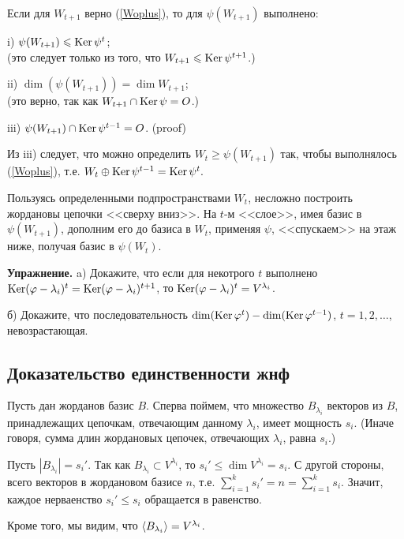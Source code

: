 Если для $W_{t+1}$ верно (\ref{Woplus}), то для $\psi (W_{t+1})$ выполнено:

i)  $\psi (W_{t+1}) \leqslant \mathop{\rm Ker}\nolimits \psi ^t $;\\
(это следует только из того, что $W_{t+1} \leqslant \mathop{\rm Ker}\nolimits \psi ^{t+1}$.)

ii) $\dim (\psi (W_{t+1})) =  \dim W_{t+1}$;\\
(это верно, так как $W_{t+1}\cap \mathop{\rm Ker}\nolimits \psi = O$.)

iii) $\psi (W_{t+1}) \cap \mathop{\rm Ker}\nolimits \psi ^{t-1} = O $.
(proof)

Из iii) следует, что можно определить $W_t\geq \psi (W_{t+1}) $ так, чтобы выполнялось 
(\ref{Woplus}), т.е. $W_{t} \oplus \mathop{\rm Ker}\nolimits \psi ^{t-1} = \mathop{\rm Ker}\nolimits \psi ^{t}.$

\otstup

Пользуясь определенными подпространствами $W_t$, несложно построить жордановы цепочки <<сверху вниз>>.
На $t$-м <<слое>>, имея базис в $\psi (W_{t+1})$, дополним его до базиса в $W_t$,
применяя $\psi$, <<спускаем>> на этаж ниже, получая базис в $\psi (W_{t})$.


\otstup

{\bf Упражнение.}
a) Докажите, что если для некотрого $t$ выполнено $\mathop{\rm Ker}\nolimits (\varphi - \lambda_i)^t = 
\mathop{\rm Ker}\nolimits (\varphi - \lambda_i)^{t+1}$, то 
$\mathop{\rm Ker}\nolimits (\varphi - \lambda_i)^t =  V^{\lambda_i}$.

б) Докажите, что последовательность $\mathop{\rm dim}\nolimits (\mathop{\rm Ker}\nolimits \varphi ^t)  - \mathop{\rm dim}\nolimits (\mathop{\rm Ker}\nolimits \varphi ^{t-1})$, $t=1, 2, \ldots$, 
невозрастающая.


\subsection{Доказательство единственности жнф}

Пусть дан жорданов базис $B$. 
Сперва поймем, что множество $B_{\lambda _i}$ векторов из $B$, принадлежащих цепочкам, отвечающим данному $\lambda _i$, 
имеет мощность $s_i$.
(Иначе говоря, сумма длин жордановых цепочек, отвечающих $\lambda _i$,  равна $s_i$.)

Пусть $|B_{\lambda _i}| = s_i'$. Так как $B_{\lambda _i} \subset V^{\lambda _i}$,
то $s_i ' \leq \dim V^{\lambda _i} = s_i$.  С другой стороны, всего векторов в жордановом базисе $n$, 
т.е. $\sum\limits_{i=1}^k s_i' = n = \sum\limits_{i=1}^k s_i$. Значит, каждое нерваенство
$s_i ' \leq  s_i$ обращается в равенство.

Кроме того, мы видим, что
$\langle B_{\lambda _i}  \rangle = V^{\lambda _i} $.

